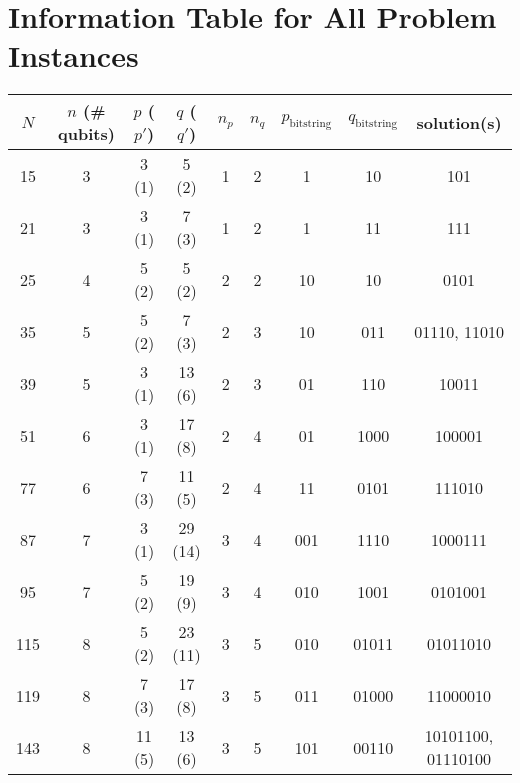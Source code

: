 \section{Information Table for All Problem Instances}
\label{Section:AppendixInformationTable}

\begin{center}
    \begin{tabular}{@{}ccccccccc@{}}
        \toprule
        $N$ & $n$ (\# qubits) & $p$ ($p'$) & $q$ ($q'$) & $n_p$ & $n_q$ & $p_\mathrm{bitstring}$ & $q_\mathrm{bitstring}$ & solution(s) \\
        \midrule
        15  & 3          & 3 (1)      & 5 (2)      & 1     & 2     & 1                      & 10                     & 101                   \\
        21  & 3          & 3 (1)      & 7 (3)      & 1     & 2     & 1                      & 11                     & 111                   \\
        25  & 4          & 5 (2)      & 5 (2)      & 2     & 2     & 10                     & 10                     & 0101                  \\
        35  & 5          & 5 (2)      & 7 (3)      & 2     & 3     & 10                     & 011                    & 01110, 11010          \\
        39  & 5          & 3 (1)      & 13 (6)     & 2     & 3     & 01                     & 110                    & 10011                 \\
        51  & 6          & 3 (1)      & 17 (8)     & 2     & 4     & 01                     & 1000                   & 100001                \\
        77  & 6          & 7 (3)      & 11 (5)     & 2     & 4     & 11                     & 0101                   & 111010                \\
        87  & 7          & 3 (1)      & 29 (14)    & 3     & 4     & 001                    & 1110                   & 1000111               \\
        95  & 7          & 5 (2)      & 19 (9)     & 3     & 4     & 010                    & 1001                   & 0101001               \\
        115 & 8          & 5 (2)      & 23 (11)    & 3     & 5     & 010                    & 01011                  & 01011010              \\
        119 & 8          & 7 (3)      & 17 (8)     & 3     & 5     & 011                    & 01000                  & 11000010              \\
        143 & 8          & 11 (5)     & 13 (6)     & 3     & 5     & 101                    & 00110                  & 10101100, 01110100    \\
        \bottomrule
    \end{tabular}
    \label{tab:instances_overview_all}
\end{center}

\clearpage
